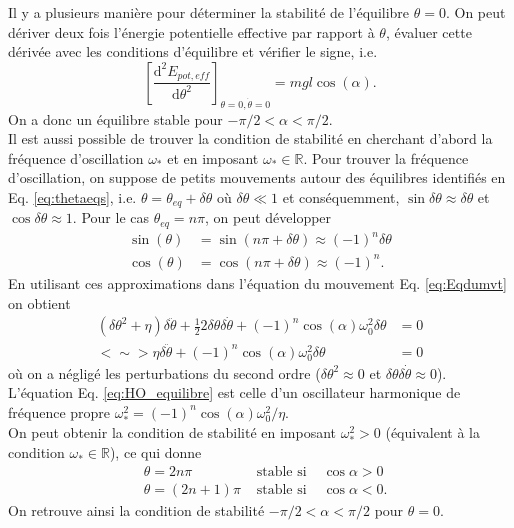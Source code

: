 \par\vspace{2mm}
Il y a plusieurs manière pour déterminer la stabilité de l'équilibre $\theta=0$.
On peut dériver deux fois l'énergie potentielle effective par rapport à $\theta$, évaluer cette dérivée avec les conditions d'équilibre et vérifier le signe, i.e.
$$
\left[\frac{\mathrm d^2 E_{pot,eff}}{\mathrm d\theta^2}\right]_{\theta=0,\dot\theta=0} = mgl\cos(\alpha).
$$
On a donc un équilibre stable pour $-\pi/2<\alpha<\pi/2$.\\
Il est aussi possible de trouver la condition de stabilité en cherchant d'abord la fréquence d'oscillation $\omega_*$ et en imposant $\omega_*\in\mathbb{R}$.
Pour trouver la fréquence d'oscillation, on suppose de petits mouvements autour des équilibres identifiés en Eq. \eqref{eq:thetaeqs}, i.e. $\theta = \theta_{eq} +\delta\theta$ o\`u $\delta\theta \ll 1$ et conséquemment, $\sin\delta\theta\approx \delta\theta$ et $\cos\delta\theta \approx 1$.
Pour le cas $\theta_{eq} = n\pi$, on peut développer
\begin{align}
    \sin(\theta) &= \sin(n\pi+\delta\theta) \approx (-1)^n \delta\theta\\
    \cos(\theta) &= \cos(n\pi+\delta\theta) \approx (-1)^n .
\end{align}
En utilisant ces approximations dans l'équation du mouvement Eq. \eqref{eq:Eqdumvt} on obtient
\begin{align}
\left(\delta\theta^2+\eta\right)\delta\ddot \theta+ \frac{1}{2}2\delta\theta \delta\dot\theta + (-1)^n \cos(\alpha) \omega_0^2 \delta\theta &=0 \nonumber\\
    <\sim> \eta\delta\ddot\theta +(-1)^n \cos(\alpha)\omega_0^2 \delta\theta   &= 0
    \label{eq:HO_equilibre}
\end{align}
où on a négligé les perturbations du second ordre ($\delta\theta^2\approx 0$ et $\delta\theta\delta\dot\theta\approx 0$).
L'équation Eq. \eqref{eq:HO_equilibre} est celle d'un oscillateur harmonique de fréquence propre $\omega_*^2=(-1)^n \cos(\alpha)\omega_0^2 /\eta$.\\
On peut obtenir la condition de stabilité en imposant $\omega_*^2>0$ (équivalent à la condition $\omega_*\in\mathbb{R}$), ce qui donne
\begin{align}
    &\theta = 2n\pi   &\textrm{ stable si }& \cos\alpha > 0 \nonumber\\
    &\theta = (2n+1)\pi &\textrm{ stable si }& \cos\alpha < 0 \nonumber.
\end{align}
On retrouve ainsi la condition de stabilité $-\pi/2<\alpha<\pi/2$ pour $\theta=0$.


